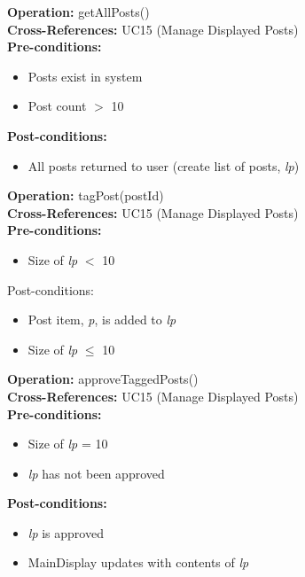 \textbf{Operation:} getAllPosts() \\
\textbf{Cross-References:} UC15 (Manage Displayed Posts) \\
\textbf{Pre-conditions:}
\begin{itemize}
    \item Posts exist in system
    \item Post count $>$ 10
\end{itemize}
\textbf{Post-conditions:}
\begin{itemize}
    \item All posts returned to user (create list of posts, \emph{lp})
\end{itemize}

\textbf{Operation:} tagPost(postId) \\
\textbf{Cross-References:} UC15 (Manage Displayed Posts) \\
\textbf{Pre-conditions: }
\begin{itemize}
    \item Size of \emph{lp} $<$ 10
\end{itemize}
Post-conditions:
\begin{itemize}
    \item Post item, \emph{p}, is added to \emph{lp}
    \item Size of \emph{lp} $\leq$ 10
\end{itemize}

\textbf{Operation:} approveTaggedPosts() \\
\textbf{Cross-References:} UC15 (Manage Displayed Posts) \\
\textbf{Pre-conditions:}
\begin{itemize}
    \item Size of \emph{lp} = 10
    \item \emph{lp} has not been approved
\end{itemize}
\textbf{Post-conditions:}
\begin{itemize}
    \item \emph{lp} is approved
    \item MainDisplay updates with contents of \emph{lp}
\end{itemize}